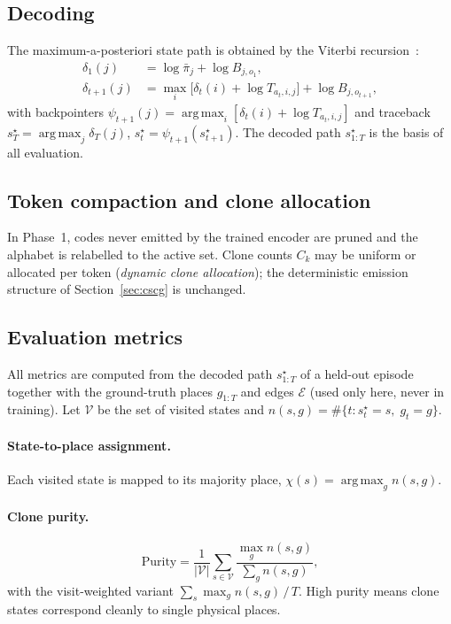 \documentclass[twocolumn,10pt]{article}
\DeclareMathOperator*{\argmax}{arg\,max}
\begin{document}
\subsection{Decoding}
\label{sec:decode}

The maximum-a-posteriori state path is obtained by the Viterbi
recursion~\cite{rabiner1989}:
\begin{align}
\delta_1(j) &= \log\bar\pi_j+\log B_{j,o_1},\\
\delta_{t+1}(j) &= \max_{i}\bigl[\delta_t(i)+\log T_{a_t,i,j}\bigr]
                   + \log B_{j,o_{t+1}},
\end{align}
with backpointers $\psi_{t+1}(j)=\argmax_i[\delta_t(i)+\log T_{a_t,i,j}]$ and
traceback $s^\star_T=\argmax_j\delta_T(j)$,
$s^\star_t=\psi_{t+1}(s^\star_{t+1})$. The decoded path $s^\star_{1:T}$ is the
basis of all evaluation.

\subsection{Token compaction and clone allocation}
In Phase~1, codes never emitted by the trained encoder are pruned and the
alphabet is relabelled to the active set. Clone counts $C_k$ may be uniform or
allocated per token (\emph{dynamic clone allocation}); the deterministic
emission structure of Section~\ref{sec:cscg} is unchanged.

\subsection{Evaluation metrics}
\label{sec:metrics}

All metrics are computed from the decoded path $s^\star_{1:T}$ of a held-out
episode together with the ground-truth places $g_{1:T}$ and edges
$\mathcal{E}$ (used only here, never in training). Let $\mathcal{V}$ be the
set of visited states and $n(s,g)=\#\{t:s^\star_t=s,\;g_t=g\}$.

\paragraph{State-to-place assignment.}
Each visited state is mapped to its majority place,
$\chi(s)=\argmax_{g}n(s,g)$.

\paragraph{Clone purity.}
\begin{equation}
\mathrm{Purity}=\frac{1}{|\mathcal{V}|}\sum_{s\in\mathcal{V}}
   \frac{\max_g n(s,g)}{\sum_g n(s,g)},
\end{equation}
with the visit-weighted variant
$\sum_s\max_g n(s,g)\,/\,T$. High purity means clone states correspond
cleanly to single physical places.
\end{document}

